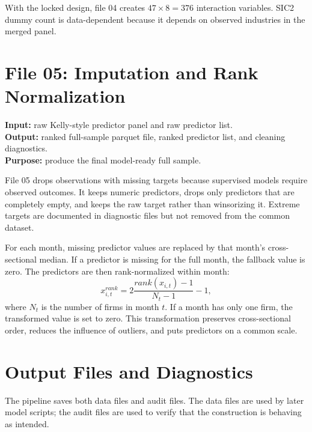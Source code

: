 \documentclass[11pt,a4paper]{article}
\begin{document}
With the locked design, file 04 creates $47\times8=376$ interaction variables. SIC2 dummy count is data-dependent because it depends on observed industries in the merged panel.

\section{File 05: Imputation and Rank Normalization}

\textbf{Input:} raw Kelly-style predictor panel and raw predictor list. \\
\textbf{Output:} ranked full-sample parquet file, ranked predictor list, and cleaning diagnostics. \\
\textbf{Purpose:} produce the final model-ready full sample.

File 05 drops observations with missing targets because supervised models require observed outcomes. It keeps numeric predictors, drops only predictors that are completely empty, and keeps the raw target rather than winsorizing it. Extreme targets are documented in diagnostic files but not removed from the common dataset.

For each month, missing predictor values are replaced by that month's cross-sectional median. If a predictor is missing for the full month, the fallback value is zero. The predictors are then rank-normalized within month:
\[
  x^{rank}_{i,t}=2\frac{rank(x_{i,t})-1}{N_t-1}-1,
\]
where $N_t$ is the number of firms in month $t$. If a month has only one firm, the transformed value is set to zero. This transformation preserves cross-sectional order, reduces the influence of outliers, and puts predictors on a common scale.

\section{Output Files and Diagnostics}

The pipeline saves both data files and audit files. The data files are used by later model scripts; the audit files are used to verify that the construction is behaving as intended.
\end{document}

